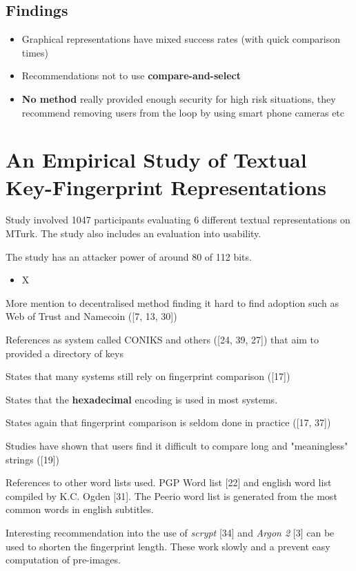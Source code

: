 \subsection{Findings}

\begin{itemize}
    \item Graphical representations have mixed success rates (with quick comparison times)
    \item Recommendations not to use \textbf{compare-and-select}
    \item \textbf{No method} really provided enough security for high risk situations, they recommend removing users from the loop by using smart phone cameras etc
\end{itemize}


\section{An Empirical Study of Textual Key-Fingerprint Representations}

Study involved 1047 participants evaluating 6 different textual representations on MTurk. The study also includes an evaluation into usability.

The study has an attacker power of around 80 of 112 bits.

\begin{itemize}
    \item X
\end{itemize}

More mention to decentralised method finding it hard to find adoption such as Web of Trust and Namecoin ([7, 13, 30])

References as system called CONIKS and others ([24, 39, 27]) that aim to provided a directory of keys

States that many systems still rely on fingerprint comparison ([17])

States that the \textbf{hexadecimal} encoding is used in most systems. 

States again that fingerprint comparison is seldom done in practice ([17, 37])

Studies have shown that users find it difficult to compare long and "meaningless" strings ([19])

References to other word lists used. PGP Word list [22] and english word list compiled by K.C. Ogden [31]. The Peerio word list is generated from the most common words in english subtitles.

Interesting recommendation into the use of \textit{scrypt} [34] and \textit{Argon 2} [3] can be used to shorten the fingerprint length. These work slowly and a prevent easy computation of pre-images.

